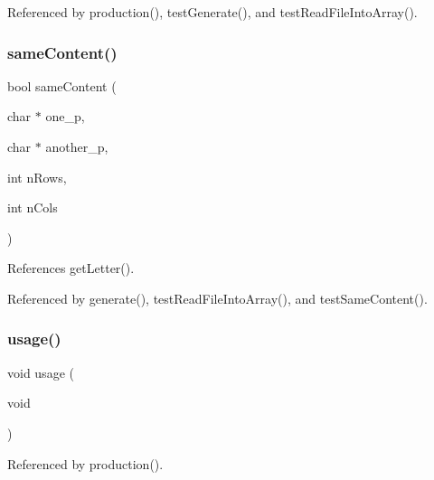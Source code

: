 Referenced by production(), test\+Generate(), and test\+Read\+File\+Into\+Array().

\mbox{\label{production_8c_a6bc14537b7dc8361ace9f0ee6aa49440}} 
\subsubsection{same\+Content()}
{\footnotesize\ttfamily bool same\+Content (\begin{DoxyParamCaption}\item[{char $\ast$}]{one\+\_\+p,  }\item[{char $\ast$}]{another\+\_\+p,  }\item[{int}]{n\+Rows,  }\item[{int}]{n\+Cols }\end{DoxyParamCaption})}



References get\+Letter().



Referenced by generate(), test\+Read\+File\+Into\+Array(), and test\+Same\+Content().

\mbox{\label{production_8c_ae8605e2b78cd4a81b6c6b5c30cb7366a}} 
\subsubsection{usage()}
{\footnotesize\ttfamily void usage (\begin{DoxyParamCaption}\item[{void}]{ }\end{DoxyParamCaption})}



Referenced by production().

